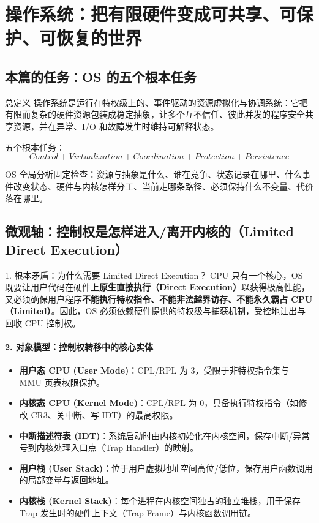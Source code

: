 \documentclass[11pt,a4paper,openany]{ctexbook}
\newcommand{\key}[1]{\textbf{\color{deep}#1}}
\begin{document}
\chapter{操作系统：把有限硬件变成可共享、可保护、可恢复的世界}

\section{本篇的任务：OS 的五个根本任务}
\begin{corebox}{总定义}
操作系统是运行在特权级上的、事件驱动的资源虚拟化与协调系统：它把有限而复杂的硬件资源包装成稳定抽象，让多个互不信任、彼此并发的程序安全共享资源，并在异常、I/O 和故障发生时维持可解释状态。
\end{corebox}

五个根本任务：
\[
\boxed{Control+Virtualization+Coordination+Protection+Persistence}
\]

OS 全局分析固定检查：资源与抽象是什么、谁在竞争、状态记录在哪里、什么事件改变状态、硬件与内核怎样分工、当前走哪条路径、必须保持什么不变量、代价落在哪里。

\section{微观轴：控制权是怎样进入/离开内核的（Limited Direct Execution）}

\begin{corebox}{1. 根本矛盾：为什么需要 Limited Direct Execution？}
CPU 只有一个核心，OS 既要让用户代码在硬件上\textbf{原生直接执行（Direct Execution）}以获得极高性能，又必须确保用户程序\textbf{不能执行特权指令、不能非法越界访存、不能永久霸占 CPU（Limited）}。因此，OS 必须依赖硬件提供的特权级与捕获机制，受控地让出与回收 CPU 控制权。
\end{corebox}

\subsubsection*{2. 对象模型：控制权转移中的核心实体}
\begin{itemize}
  \item \key{用户态 CPU (User Mode)}：CPL/RPL 为 3，受限于非特权指令集与 MMU 页表权限保护。
  \item \key{内核态 CPU (Kernel Mode)}：CPL/RPL 为 0，具备执行特权指令（如修改 CR3、关中断、写 IDT）的最高权限。
  \item \key{中断描述符表 (IDT)}：系统启动时由内核初始化在内核空间，保存中断/异常号到内核处理入口点（Trap Handler）的映射。
  \item \key{用户栈 (User Stack)}：位于用户虚拟地址空间高位/低位，保存用户函数调用的局部变量与返回地址。
  \item \key{内核栈 (Kernel Stack)}：每个进程在内核空间独占的独立堆栈，用于保存 Trap 发生时的硬件上下文（Trap Frame）与内核函数调用链。
\end{itemize}
\end{document}

